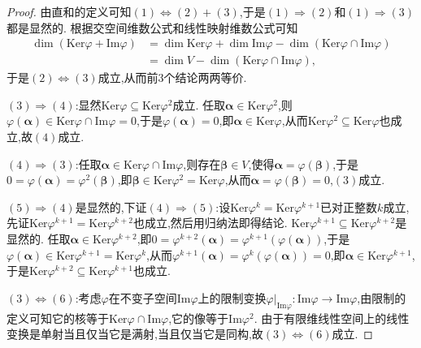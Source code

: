 \documentclass[../../main.tex]{subfiles}%
\begin{document}
\begin{proof}

由直和的定义可知\((1)\Leftrightarrow(2)+(3)\),于是\((1)\Rightarrow(2)\)和\((1)\Rightarrow(3)\)都是显然的. 根据交空间维数公式和线性映射维数公式可知
\begin{align*}
\dim(\text{Ker}\varphi+\text{Im}\varphi)&=\dim\text{Ker}\varphi+\dim\text{Im}\varphi-\dim(\text{Ker}\varphi\cap\text{Im}\varphi)\\
&=\dim V-\dim(\text{Ker}\varphi\cap\text{Im}\varphi),
\end{align*}
于是\((2)\Leftrightarrow(3)\)成立,从而前3个结论两两等价.

\((3)\Rightarrow(4)\):显然\(\text{Ker}\varphi\subseteq\text{Ker}\varphi^2\)成立. 任取\(\boldsymbol{\alpha}\in\text{Ker}\varphi^2\),则\(\varphi(\boldsymbol{\alpha})\in\text{Ker}\varphi\cap\text{Im}\varphi = 0\),于是\(\varphi(\boldsymbol{\alpha}) = 0\),即\(\boldsymbol{\alpha}\in\text{Ker}\varphi\),从而\(\text{Ker}\varphi^2\subseteq\text{Ker}\varphi\)也成立,故\((4)\)成立.

\((4)\Rightarrow(3)\):任取\(\boldsymbol{\alpha}\in\text{Ker}\varphi\cap\text{Im}\varphi\),则存在\(\boldsymbol{\beta}\in V\),使得\(\boldsymbol{\alpha}=\varphi(\boldsymbol{\beta})\),于是\(0=\varphi(\boldsymbol{\alpha})=\varphi^2(\boldsymbol{\beta})\),即\(\boldsymbol{\beta}\in\text{Ker}\varphi^2=\text{Ker}\varphi\),从而\(\boldsymbol{\alpha}=\varphi(\boldsymbol{\beta}) = 0\),\((3)\)成立.

\((5)\Rightarrow(4)\)是显然的,下证\((4)\Rightarrow(5)\):设\(\text{Ker}\varphi^k=\text{Ker}\varphi^{k + 1}\)已对正整数\(k\)成立,先证\(\text{Ker}\varphi^{k + 1}=\text{Ker}\varphi^{k + 2}\)也成立,然后用归纳法即得结论. \(\text{Ker}\varphi^{k + 1}\subseteq\text{Ker}\varphi^{k + 2}\)是显然的. 任取\(\boldsymbol{\alpha}\in\text{Ker}\varphi^{k + 2}\),即\(0=\varphi^{k + 2}(\boldsymbol{\alpha})=\varphi^{k + 1}(\varphi(\boldsymbol{\alpha}))\),于是\(\varphi(\boldsymbol{\alpha})\in\text{Ker}\varphi^{k + 1}=\text{Ker}\varphi^k\),从而\(\varphi^{k + 1}(\boldsymbol{\alpha})=\varphi^k(\varphi(\boldsymbol{\alpha})) = 0\),即\(\boldsymbol{\alpha}\in\text{Ker}\varphi^{k + 1}\),于是\(\text{Ker}\varphi^{k + 2}\subseteq\text{Ker}\varphi^{k + 1}\)也成立.

\((3)\Leftrightarrow(6)\):考虑\(\varphi\)在不变子空间\(\text{Im}\varphi\)上的限制变换\(\varphi|_{\text{Im}\varphi}:\text{Im}\varphi\to\text{Im}\varphi\),由限制的定义可知它的核等于\(\text{Ker}\varphi\cap\text{Im}\varphi\),它的像等于\(\text{Im}\varphi^2\). 由于有限维线性空间上的线性变换是单射当且仅当它是满射,当且仅当它是同构,故\((3)\Leftrightarrow(6)\)成立.


\end{proof}
\end{document}
